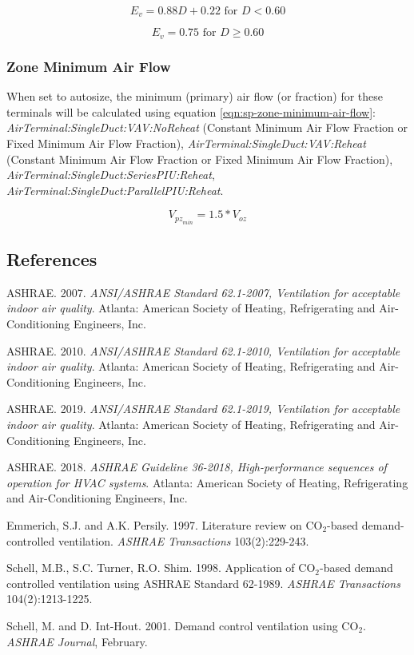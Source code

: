 \begin{equation}\label{eqn:ev-low-d}
{E_{v}} = 0.88 {D} + 0.22 \text{ for } D < 0.60
\end{equation}

\begin{equation}\label{eqn:ev-high-d}
{E_{v}} = 0.75 \text{ for } D \geq 0.60
\end{equation}

\subsubsection{Zone Minimum Air Flow}\label{sp-zone-minimum-air-flow}
When set to autosize, the minimum (primary) air flow (or fraction) for these terminals will be calculated using equation \ref{eqn:sp-zone-minimum-air-flow}: \emph{AirTerminal:SingleDuct:VAV:NoReheat} (Constant Minimum Air Flow Fraction or Fixed Minimum Air Flow Fraction), \emph{AirTerminal:SingleDuct:VAV:Reheat} (Constant Minimum Air Flow Fraction or Fixed Minimum Air Flow Fraction), \emph{AirTerminal:SingleDuct:SeriesPIU:Reheat}, \emph{AirTerminal:SingleDuct:ParallelPIU:Reheat}.

\begin{equation}\label{eqn:sp-zone-minimum-air-flow}
{V_{{pz}_{min}}} = 1.5 * {V_{oz}}
\end{equation}

\subsection{References}\label{references-018}

ASHRAE. 2007. \emph{ANSI/ASHRAE Standard 62.1-2007, Ventilation for acceptable indoor air quality}. Atlanta: American Society of Heating, Refrigerating and Air-Conditioning Engineers, Inc.

ASHRAE. 2010. \emph{ANSI/ASHRAE Standard 62.1-2010, Ventilation for acceptable indoor air quality}. Atlanta: American Society of Heating, Refrigerating and Air-Conditioning Engineers, Inc.

ASHRAE. 2019. \emph{ANSI/ASHRAE Standard 62.1-2019, Ventilation for acceptable indoor air quality}. Atlanta: American Society of Heating, Refrigerating and Air-Conditioning Engineers, Inc.

ASHRAE. 2018. \emph{ASHRAE Guideline 36-2018, High-performance sequences of operation for HVAC systems}. Atlanta: American Society of Heating, Refrigerating and Air-Conditioning Engineers, Inc.

Emmerich, S.J. and A.K. Persily. 1997. Literature review on CO\(_{2}\)-based demand-controlled ventilation. \emph{ASHRAE Transactions} 103(2):229-243.

Schell, M.B., S.C. Turner, R.O. Shim. 1998. Application of CO\(_{2}\)-based demand controlled ventilation using ASHRAE Standard 62-1989. \emph{ASHRAE Transactions} 104(2):1213-1225.

Schell, M. and D. Int-Hout. 2001. Demand control ventilation using CO\(_{2}\). \emph{ASHRAE Journal}, February.
